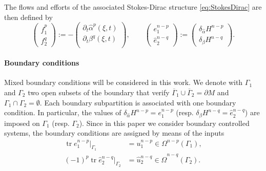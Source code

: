 \documentclass{elsarticle}
\newcommand{\revTwo}[1]{{\color{black}#1}}
\DeclareMathOperator{\tr}{tr}
\newcommand*{\dual}[1]{\ensuremath{\widehat{#1}}}
\begin{document}
\revTwo{
The flows and efforts of the associated Stokes-Dirac 
structure \eqref{eq:StokesDirac} are then defined by
\begin{equation}\label{eq:pHsys_flows_efforts}
\begin{pmatrix}
        \dual{f}^p_1 \\
        f^q_2
    \end{pmatrix} := -
    \begin{pmatrix}
        \partial_t \dual{\alpha}^p(\xi, t) \\
        \partial_t \beta^{q}(\xi, t) \\
    \end{pmatrix}, \qquad 
    \begin{pmatrix}
        e^{n-p}_1 \\
        \dual{e}^{n-q}_2
    \end{pmatrix} := 
    \begin{pmatrix}
        \delta_{\dual{\alpha}} H^{n-p} \\
        \delta_{\beta} H^{n-q}
    \end{pmatrix}.
\end{equation}
\paragraph{Boundary conditions}
Mixed boundary conditions will be considered in this work. We denote with $\Gamma_1$  and $\Gamma_2$ two open subsets of the boundary that   verify $\overline{\Gamma}_1 \cup \overline{\Gamma}_2 = \partial M$ and $\Gamma_1 \cap \Gamma_2=\emptyset$. Each boundary subpartition is associated with one boundary condition. In particular, the values of $\delta_{\dual{\alpha}} H^{n-p} = e^{n-p}_1$ (resp. $\delta_{\beta} H^{n-q}= \dual{e}^{n-q}_2$) are imposed on $\Gamma_1$ (resp. $\Gamma_2$). Since in this paper we consider boundary controlled systems, the boundary conditions are assigned by means of the inputs
 \begin{equation}\label{eq:u}
 \begin{aligned}
     \tr e^{n-p}_1 \vert_{\Gamma_1} &= u^{n-p}_1 \in \Omega^{n-p}(\Gamma_1), \\
    (-1)^p \tr \dual{e}^{n-q}_2 \vert_{\Gamma_2} &= \dual{u}^{n-q}_2 \in \dual{\Omega}^{n-q}(\Gamma_2).
 \end{aligned}
 \end{equation}
}
\end{document}
